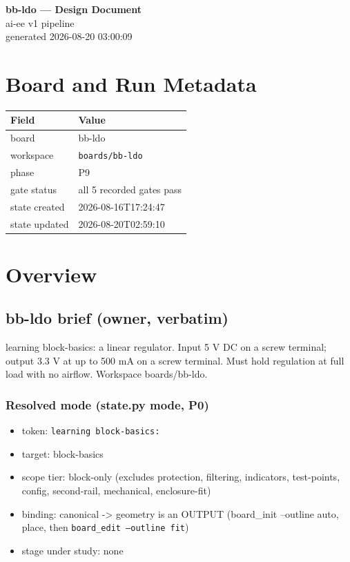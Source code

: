 \documentclass[11pt,a4paper]{article}
\begin{document}
\sloppy
\begin{center}
{\LARGE\bfseries bb-ldo --- Design Document}\\[6pt]
{\large ai-ee v1 pipeline}\\[2pt]
generated 2026-08-20 03:00:09
\end{center}
\tableofcontents

\section{Board and Run Metadata}
{\small
\begin{longtable}{lp{11cm}}
\toprule
\textbf{Field} & \textbf{Value} \\
\midrule
\endhead
board & bb-ldo \\
workspace & \texttt{boards/bb-ldo} \\
phase & P9 \\
gate status & all 5 recorded gates pass \\
state created & 2026-08-16T17:24:47 \\
state updated & 2026-08-20T02:59:10 \\
\bottomrule
\end{longtable}
}
\section{Overview}
\subsection*{bb-ldo brief (owner, verbatim)}
learning block-basics: a linear regulator. Input 5 V DC on a screw terminal; output 3.3 V at up to 500 mA on a screw terminal. Must hold regulation at full load with no airflow. Workspace boards/bb-ldo.

\subsubsection*{Resolved mode (state.py mode, P0)}
\begin{itemize}
\item token: \texttt{learning block-basics:}
\item target: block-basics
\item scope tier: block-only (excludes protection, filtering, indicators,
test-points, config, second-rail, mechanical, enclosure-fit)
\item binding: canonical -\textgreater{} geometry is an OUTPUT (board\_init --outline auto,
place, then \texttt{board\_edit --outline fit})
\item stage under study: none
\end{itemize}
\end{document}
